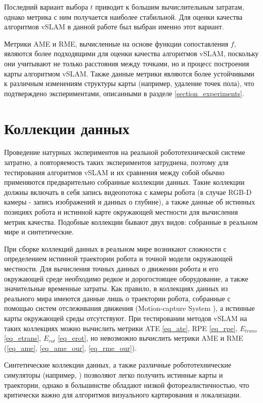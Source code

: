 \documentclass{mipt-thesis-ms}
\begin{document}
	Последний вариант выбора $t$ приводит к большим вычислительным затратам, однако метрика с ним получается наиболее стабильной. Для оценки качества алгоритмов vSLAM в данной работе был выбран именно этот вариант.
	
	Метрики AME и RME, вычисленные на основе функции сопоставления $f$, являются более подходящими для оценки качества алгоритмов vSLAM, поскольку они учитывают не только расстояния между точками, но и процесс построения карты алгоритмом vSLAM. Также данные метрики являются более устойчивыми к различным изменениям структуры карты (например, удаление точек пола), что подтверждено экспериментами, описанными в разделе \ref{section_experiments}.
	
	\section{Коллекции данных}
	
	 Проведение натурных экспериментов на реальной робототехнической системе затратно, а повторяемость таких экспериментов затруднена, поэтому для тестирования алгоритмов vSLAM и их сравнения между собой обычно применяются предварительно собранные коллекции данных. Такие коллекции должны включать в себя запись видеопотока с камеры робота (в случае RGB-D камеры - запись изображений и данных о глубине), а также данные об истинных позициях робота и истинной карте окружающей местности для вычисления метрик качества. Подобные коллекции бывают двух видов: собранные в реальном мире и синтетические.
	 
	 При сборке коллекций данных в реальном мире возникают сложности с определением истинной траектории робота и точной модели окружающей местности. Для вычисления точных данных о движении робота и его окружающей среде необходимо редкое и дорогостоящее оборудование, а также значительные временные затраты. Как правило, в коллекциях данных из реального мира имеются данные лишь о траектории робота, собранные с помощью систем отслеживания движения (Motion-capture System \cite{kurihara2002optical}), а истинные карты окружающей среды отсутствуют. При тестировании методов vSLAM на таких коллекциях можно вычислить метрики ATE \ref{eq_ate}, RPE \ref{eq_rpe}, $E_{trans}$ \ref{eq_etrans}, $E_{rot}$ \ref{eq_erot}, но невозможно вычислить метрики AME и RME (\ref{eq_ame}, \ref{eq_ame_our}, \ref{eq_rme_our}).
	 
	 Синтетические коллекции данных, а также различные робототехнические симуляторы (например, \cite{koenig2004design} \cite{rooban2021coppeliasim}) позволяют легко получить истинные карты и траектории, однако в большинстве обладают низкой фотореалистичностью, что критически важно для алгоритмов визуального картирования и локализации.
	
\end{document}
